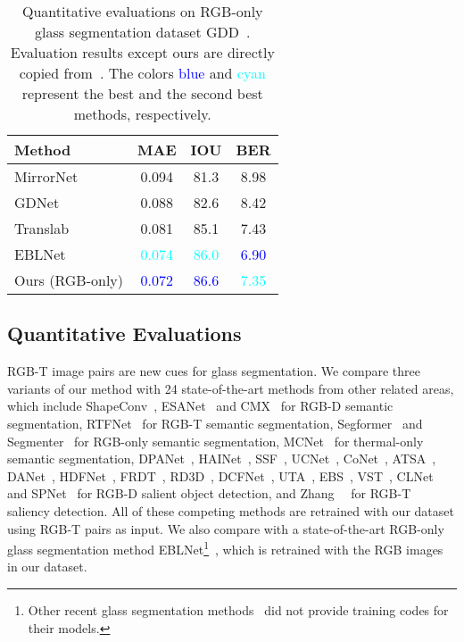 \begin{table}[t]
\renewcommand\arraystretch{1.5}
\setlength\tabcolsep{5pt}
\centering
\caption{Quantitative evaluations on RGB-only glass segmentation dataset GDD~\cite{mei2020don}. Evaluation results except ours are directly copied from~\cite{He_2021_ICCV}. The colors \textcolor{blue}{blue} and \textcolor{cyan}{cyan} represent the best and the second best methods, respectively.}
\label{tab:GDD}
\begin{tabular}{lccc}
\toprule
Method          & MAE   & IOU  & BER  \\ 
\midrule
MirrorNet~\cite{yang2019my}       & 0.094 & 81.3 & 8.98 \\ 
GDNet~\cite{mei2020don}           & 0.088 & 82.6 & 8.42 \\ 
Translab~\cite{xie2020segmenting}        & 0.081 & 85.1 & 7.43 \\ 
EBLNet~\cite{He_2021_ICCV}          & \textcolor{cyan}{0.074} & \textcolor{cyan}{86.0} & \textcolor{blue}{6.90} \\ \hline
Ours (RGB-only) & \textcolor{blue}{0.072} & \textcolor{blue}{86.6} & \textcolor{cyan}{7.35} \\ 
\bottomrule
\end{tabular}
\end{table}


\subsection{Quantitative Evaluations}
\label{sec:quan}
RGB-T image pairs are new cues for glass segmentation. We compare three variants of our method with 24 state-of-the-art methods from other related areas, which include ShapeConv~\cite{cao2021shapeconv}, ESANet~\cite{seichter2021efficient} and CMX~\cite{liu2022cmx} for RGB-D semantic segmentation, RTFNet~\cite{sun2019rtfnet} for RGB-T semantic segmentation, Segformer~\cite{xie2021segformer} and Segmenter~\cite{strudel2021segmenter} for RGB-only semantic segmentation, MCNet~\cite{xiong2021mcnet} for thermal-only semantic segmentation, DPANet~\cite{chen2020dpanet}, HAINet~\cite{li2021hierarchical}, SSF~\cite{zhang2020select}, UCNet~\cite{zhang2020uc}, CoNet~\cite{ji2020accurate}, ATSA~\cite{zhang2020asymmetric}, DANet~\cite{zhao2020single}, HDFNet~\cite{pang2020hierarchical}, FRDT~\cite{zhang2020feature}, RD3D~\cite{chen2021rgb}, DCFNet~\cite{ji2021calibrated}, UTA~\cite{zhao2021rgb}, EBS~\cite{zhang2021learning}, VST~\cite{liu2021visual}, CLNet~\cite{zhang2021rgb} and SPNet~\cite{zhou2021specificity} for RGB-D salient object detection, and Zhang~\etal~\cite{zhang2020revisiting} for RGB-T saliency detection. All of these competing methods are retrained with our dataset using RGB-T pairs as input. We also compare with a state-of-the-art RGB-only glass segmentation method EBLNet\footnote{Other recent glass segmentation methods~\cite{yang2019my, mei2020don,lin2021rich} did not provide training codes for their models.}~\cite{He_2021_ICCV}, which is retrained with the RGB images in our dataset. 



